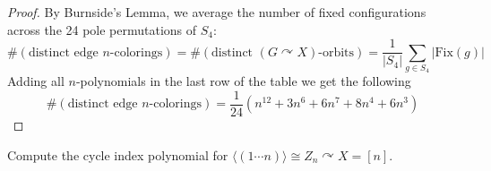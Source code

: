 \documentclass[addpoints,10pt]{exam}
\theoremstyle{plain}
\theoremstyle{definition}
\newtheorem{prob}[thm]{Problem}
\theoremstyle{plain}
\theoremstyle{plain}
\theoremstyle{definition}
\let\oldprob\prob
\let\endoldprob\endprob
\renewenvironment{prob}
  {\begin{singlespace}\oldprob}
  {\endoldprob\end{singlespace}}
\begin{document}
\begin{proof}
\noindent By Burnside's Lemma, we average the number of fixed configurations across the 24 pole permutations of $S_4$:
\[
\#(\text{distinct edge } n\text{-colorings}) = \#(\text{distinct $(G\curvearrowright X)$-orbits})= \frac{1}{|S_{4}|}\sum_{g\in S_4}|\mathrm{Fix}(g)|
\]
Adding all $n$-polynomials in the last row of the table we get the following
\[
\#(\text{distinct edge $n$-colorings}) = \frac{1}{24}\left(n^{12} + 3n^6 + 6n^7 + 8n^4 + 6n^3\right)
\]

\end{proof}


\newpage
\setcounter{thm}{10}
\renewcommand{\thethm}{\arabic{thm}(a)}

\begin{prob}
Compute the cycle index polynomial for $\langle (1\cdots n)\rangle \cong Z_{n}\curvearrowright X= [n].$
\end{prob}
\end{document}
